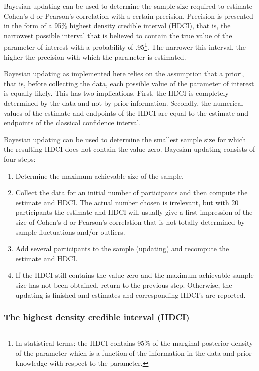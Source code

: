 \documentclass[
  letterpaper,
  DIV=11,
  numbers=noendperiod]{scrartcl}
\begin{document}
Bayesian updating can be used to determine the sample size required to
estimate Cohen's d or Pearson's correlation with a certain precision.
Precision is presented in the form of a 95\% highest density credible
interval (HDCI), that is, the narrowest possible interval that is
believed to contain the true value of the parameter of interest with a
probability of .95\footnote{In statistical terms: the HDCI contains 95\%
  of the marginal posterior density of the parameter which is a function
  of the information in the data and prior knowledge with respect to the
  parameter.}. The narrower this interval, the higher the precision with
which the parameter is estimated.

Bayesian updating as implemented here relies on the assumption that a
priori, that is, before collecting the data, each possible value of the
parameter of interest is equally likely. This has two implications.
First, the HDCI is completely determined by the data and not by prior
information. Secondly, the numerical values of the estimate and
endpoints of the HDCI are equal to the estimate and endpoints of the
classical confidence interval.

Bayesian updating can be used to determine the smallest sample size for
which the resulting HDCI does not contain the value zero. Bayesian
updating consists of four steps:

\begin{enumerate}
\def\labelenumi{\arabic{enumi}.}
\item
  Determine the maximum achievable size of the sample.
\item
  Collect the data for an initial number of participants and then
  compute the estimate and HDCI. The actual number chosen is irrelevant,
  but with 20 participants the estimate and HDCI will usually give a
  first impression of the size of Cohen's d or Pearson's correlation
  that is not totally determined by sample fluctuations and/or outliers.
\item
  Add several participants to the sample (updating) and recompute the
  estimate and HDCI.
\item
  If the HDCI still contains the value zero and the maximum achievable
  sample size has not been obtained, return to the previous step.
  Otherwise, the updating is finished and estimates and corresponding
  HDCI's are reported.
\end{enumerate}

\subsubsection{The highest density credible interval
(HDCI)}\label{the-highest-density-credible-interval-hdci}
\end{document}
